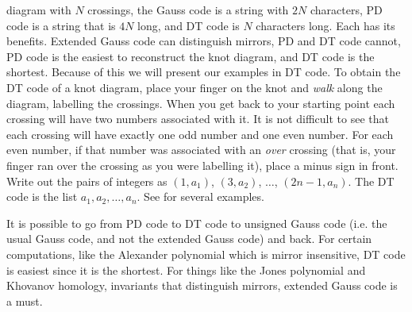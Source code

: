 \documentclass{article}
\theoremstyle{plain}
\begin{document}
        diagram with $N$ crossings, the Gauss code is a string with $2N$
        characters, PD code is a string that is $4N$ long, and DT code is $N$
        characters long. Each has its benefits. Extended Gauss code can
        distinguish mirrors, PD and DT code cannot, PD code is the easiest to
        reconstruct the knot diagram, and DT code is the shortest. Because of
        this we will present our examples in DT code. To obtain the DT code of
        a knot diagram, place your finger on the knot and \textit{walk} along
        the diagram, labelling the crossings. When you get back to your starting
        point each crossing will have two numbers associated with it. It is
        not difficult to see that each crossing will have exactly one odd number
        and one even number. For each even number, if that number was associated
        with an \textit{over} crossing (that is, your finger ran over the
        crossing as you were labelling it), place a minus sign in front. Write
        out the pairs of integers as $(1,a_{1})$, $(3,a_{2})$, $\dots$,
        $(2n-1,a_{n})$. The DT code is the list $a_{1},a_{2},\dots,a_{n}$.
        See \cite{KatlasDTCode} for several examples.
        \par\hfill\par
        It is possible to go from PD code to DT code to unsigned
        Gauss code (i.e. the usual Gauss code, and not the extended Gauss code)
        and back. For certain computations, like the Alexander polynomial which
        is mirror insensitive, DT code is easiest since it is the shortest.
        For things like the Jones polynomial and Khovanov homology, invariants
        that distinguish mirrors, extended Gauss code is a must.
\end{document}
